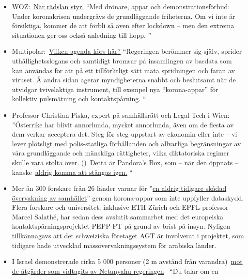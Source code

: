\begin{itemize}
\tightlist
\item
  WOZ:~\href{https://www.woz.ch/2016/grundrechte/wenn-die-angst-regiert}{När
  rädslan styr.} ``Med drönare, appar och demonstrationsförbud: Under
  koronakrisen undergrävs de grundläggande friheterna. Om vi ​​inte är
  försiktiga, kommer de att förbli så även efter lockdown -- men den
  extrema situationen ger oss också anledning till hopp. ''
\item
  Multipolar:~\href{https://multipolar-magazin.de/artikel/die-massnahmen-wirken}{Vilken
  agenda körs här?} ``Regeringen berömmer sig själv, sprider
  uthållighetsslogans och samtidigt bromsar på insamlingen av basdata
  som kan användas för att på ett tillförlitligt sätt mäta spridningen
  och faran av viruset. Å andra sidan agerar myndigheterna snabbt och
  beslutsamt när de utvidgar tvivelaktiga instrument, till exempel nya
  ``korona-appar'' för kollektiv pulsmätning och kontaktspårning. ``
\item
  Professor Christian Piska, expert på samhällsrätt och Legal Tech i
  Wien: ''Österrike har blivit annorlunda, mycket annorlunda, även om de
  flesta av dem verkar acceptera det. Steg för steg uppstart av ekonomin
  eller inte -- vi lever plötsligt med polis-statliga förhållanden och
  allvarliga begränsningar av våra grundläggande och mänskliga
  rättigheter, vilka diktatoriska regimer skulle vara stolta över.
  ()~Detta är Pandora's Box, som -- när den öppnats --
  kanske~\href{https://kurier.at/meinung/das-juristische-totschlagargument-vom-menschenleben/400814570}{aldrig
  komma att stängas igen.} ``
\item
  Mer än 300 forskare från 26 länder varnar för
  ''\href{https://www.golem.de/news/corona-app-300-wissenschaftler-warnen-vor-zentraler-datenspeicherung-2004-147973.html}{en
  aldrig tidigare skådad övervakning av samhället}'' genom korona-appar
  som inte uppfyller dataskydd. Flera forskare och universitet,
  inklusive ETH Zürich och EPFL-professor Marcel Salathé, har sedan dess
  avslutit sammarbet med det europeiska kontaktspårningsprojektet
  PEPP-PT på grund av brist på insyn. Nyligen tillkännagavs att det
  schweiziska företaget AGT är involverat i projektet, som tidigare hade
  utvecklad massövervakningssystem för arabiska länder.
\item
  I Israel demonstrerade cirka 5 000 personer (2 m avstånd från
  varandra)~\href{https://edition.cnn.com/2020/04/20/middleeast/israel-protest-social-distancing-intl/index.html}{mot
  de åtgärder som vidtagits av Netanyahu-regeringen} ~``Du talar om en

\end{itemize}
